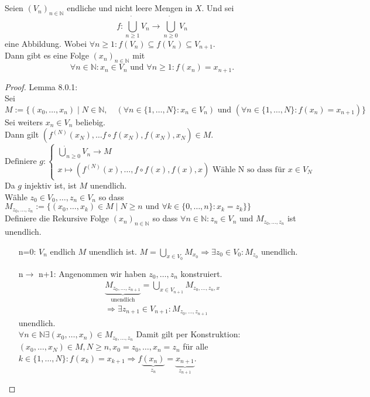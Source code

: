 \chapter{}

\mlenma{}
{
    Seien $(V_n)_{n \in \mathbb{N}}$ endliche und nicht leere Mengen in $X$. 
    Und sei 
    $$
    f: \dot{\bigcup_{n \geq 1}} V_n \to \dot{\bigcup_{n \geq 0}} V_n
    $$ eine Abbildung. 
    Wobei $\forall n \geq 1: f(V_n) \subseteq f(V_{n})\subseteq V_{n+1}$. \\
    Dann gibt es eine  Folge $(x_n)_{n \in \mathbb{N}}$ mit
    $$
    \forall n \in  \mathbb{N}: x_n \in V_n 
    \text{ und } \forall n \geq 1: f(x_n) = x_{n+1}.
    $$  
}

\begin{proof}{Lemma 8.0.1:}\\
    Sei 
    $$
    M:=\{(x_0,\dots,x_n)\mid N \in \mathbb{N}, \quad (\forall n \in \{1,\dots, N\}: x_n \in V_n )
    \text{ und } (\forall n \in \{1,\dots, N\}: f(x_n) = x_{n+1})\}
    $$
    Sei weiters $x_n \in V_n$ beliebig. \\
    Dann gilt $(f^{(N)}(x_N),\dots f \circ f (x_N), f(x_N), x_N) \in M$.
    $$
    \text{Definiere } g: 
    \begin{cases}
    \dot{\bigcup}_{n\geq 0} V_n \to M \\
    x \mapsto (f^{(N)}(x),\dots, f \circ f (x), f(x), x) \text{ Wähle N so dass für } x \in V_N
    \end{cases}
    $$
    Da $g$ injektiv ist, ist $M$ unendlich.\\
    Wähle  $z_0 \in V_0, \dots, z_n \in V_n$ so dass 
    $M_{z_0,\dots,z_n} := \{(x_0,\dots,x_k) \in M \mid N \geq n \text{ und } 
    \forall k \in \{0,\dots,n\}: x_k = z_k\}\}$\\
    Definiere die Rekursive Folge $(x_n)_{n \in \mathbb{N}}$ 
    so dass $\forall n \in \mathbb{N}: z_n \in V_n \text{ und } M_{z_0,\dots,z_n}$ ist unendlich.
    \begin{itemize}
        \item[n=0:] $V_n$ endlich $M$ unendlich ist. 
        $M=\bigcup_{x \in V_0} M_{x_0}\Rightarrow \exists z_0 \in V_0: M_{z_0}$ unendlich.
        \item[n$\to$ n+1:] Angenommen wir haben $z_0,\dots,z_n$ konstruiert.\\
        \begin{equation*}
        \begin{split}
        &\underbrace{M_{z_0,\dots,z_{n+1}}}_{\text{unendlich}} 
        = \bigcup_{x \in V_{n+1}} M_{z_0,\dots,z_n,x}\\
        &\Rightarrow \exists z_{n+1} \in V_{n+1}: M_{z_0,\dots,z_{n+1}}
        \end{split}
        \end{equation*}
        unendlich.\\
        $\forall n \in \mathbb{N} \exists (x_0,\dots,x_n) \in M_{z_0,\dots,z_n}$
        Damit gilt per Konstruktion: $(x_0,\dots,x_N) \in M, N \geq n, x_0 = z_0,\dots,x_n = z_n$
        für alle $k \in \{1,\dots,N\}:  f(x_k) = x_{k+1} 
        \Rightarrow f\underbrace{(x_n)}_{z_n} = \underbrace{x_{n+1}}_{z_{n+1}}$.
    \end{itemize}
\end{proof}